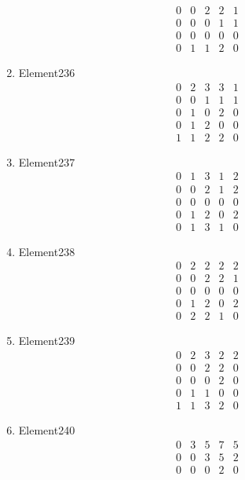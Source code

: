 \documentclass[12pt]{article}
\begin{document}
\begin{multicols}{3}
\begin{enumerate}
\begin{equation*}
\begin{array}{ccccc}
0&0&2&2&1\\
0&0&0&1&1\\
0&0&0&0&0\\
0&1&1&2&0
\end{array}
\end{equation*}
\item Element236
\begin{equation*}
\begin{array}{ccccc}
0&2&3&3&1\\
0&0&1&1&1\\
0&1&0&2&0\\
0&1&2&0&0\\
1&1&2&2&0
\end{array}
\end{equation*}
\item Element237
\begin{equation*}
\begin{array}{ccccc}
0&1&3&1&2\\
0&0&2&1&2\\
0&0&0&0&0\\
0&1&2&0&2\\
0&1&3&1&0
\end{array}
\end{equation*}
\item Element238
\begin{equation*}
\begin{array}{ccccc}
0&2&2&2&2\\
0&0&2&2&1\\
0&0&0&0&0\\
0&1&2&0&2\\
0&2&2&1&0
\end{array}
\end{equation*}
\item Element239
\begin{equation*}
\begin{array}{ccccc}
0&2&3&2&2\\
0&0&2&2&0\\
0&0&0&2&0\\
0&1&1&0&0\\
1&1&3&2&0
\end{array}
\end{equation*}
\item Element240
\begin{equation*}
\begin{array}{ccccc}
0&3&5&7&5\\
0&0&3&5&2\\
0&0&0&2&0\\

\end{array}
\end{equation*}
\end{enumerate}
\end{multicols}
\end{document}
